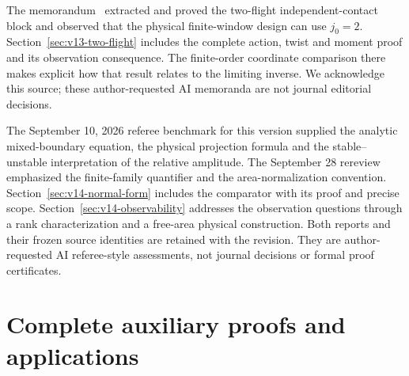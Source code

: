 The memorandum~\cite{A2ReviewV12} extracted and proved the two-flight
independent-contact block and observed that the physical finite-window
design can use $j_0=2$. Section~\ref{sec:v13-two-flight} includes the
complete action, twist and moment proof and its observation consequence.
The finite-order coordinate comparison there makes explicit how that
result relates to the limiting inverse. We acknowledge this source;
these author-requested AI memoranda are not journal editorial decisions.

The September 10, 2026 referee benchmark for this version supplied the
analytic mixed-boundary equation, the physical projection formula and
the stable--unstable interpretation of the relative amplitude. The
September 28 rereview emphasized the finite-family quantifier and the
area-normalization convention. Section~\ref{sec:v14-normal-form}
includes the comparator with its proof and precise scope.
Section~\ref{sec:v14-observability} addresses the observation questions
through a rank characterization and a free-area physical construction.
Both reports and their frozen source identities are retained with the
revision. They are author-requested AI referee-style assessments, not
journal decisions or formal proof certificates.

\appendix
\renewcommand{\thesection}{A.\arabic{section}}
\renewcommand{\theHsection}{appendix.\arabic{section}}
\part{Complete auxiliary proofs and applications}






































